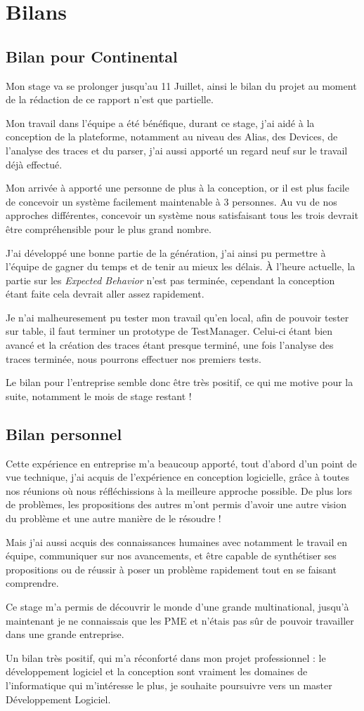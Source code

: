 \chapter{Bilans}
	\section{Bilan pour Continental}
	Mon stage va se prolonger jusqu'au 11 Juillet, ainsi le bilan du projet au moment de la rédaction de ce rapport n'est que partielle. 

	Mon travail dans l'équipe a été bénéfique, durant ce stage, j'ai aidé à la conception de la plateforme, notamment au niveau des Alias, des Devices, de l'analyse des traces et du parser,	j'ai aussi apporté un regard neuf sur le travail déjà effectué.

	Mon arrivée à apporté une personne de plus à la conception, or il est plus facile de concevoir un système facilement maintenable à 3 personnes. Au vu de nos
	approches différentes, concevoir un système nous satisfaisant tous les trois devrait être compréhensible pour le plus grand nombre.
	
	J'ai développé une bonne partie de la génération, j'ai ainsi pu permettre à l'équipe de gagner du temps et de
	tenir au mieux les délais. À l'heure actuelle, la partie sur les \textit{Expected Behavior} n'est pas terminée, cependant la conception étant faite cela devrait aller
	assez rapidement.
	
	Je n'ai malheuresement pu tester mon travail qu'en local, afin de pouvoir tester sur table, il faut terminer un prototype de TestManager. Celui-ci étant bien
	avancé et la création des traces étant presque terminé, une fois l'analyse des traces terminée, nous pourrons effectuer nos premiers tests.

	Le bilan pour l'entreprise semble donc être très positif, ce qui me motive pour la suite, notamment le mois de stage restant !

	\section{Bilan personnel}
	Cette expérience en entreprise m'a beaucoup apporté, tout d'abord d'un point de vue technique, j'ai acquis de l'expérience en conception logicielle, grâce
	à toutes nos réunions où nous réfléchissions à la meilleure approche possible. De plus lors de problèmes, les propositions des autres m'ont permis d'avoir
	une autre vision du problème et une autre manière de le résoudre !

	Mais j'ai aussi acquis des connaissances humaines avec notamment le travail en équipe, communiquer sur nos avancements, et être capable de synthétiser ses
	propositions ou de réussir à poser un problème rapidement tout en se faisant comprendre.

	Ce stage m'a permis de découvrir le monde d'une grande multinational, jusqu'à maintenant je ne connaissais que les PME et n'étais pas sûr de pouvoir
	travailler dans une grande entreprise.

	Un bilan très positif, qui m'a réconforté dans mon projet professionnel : le développement logiciel et la conception sont vraiment les domaines de
	l'informatique qui m'intéresse le plus, je souhaite poursuivre vers un master Développement Logiciel.
